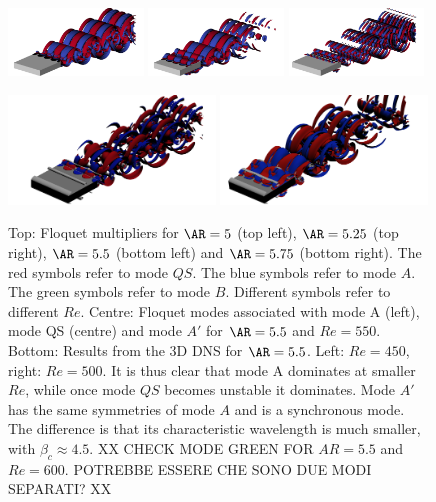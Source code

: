 \documentclass{jfm}
\begin{document}
\begin{figure}
\begin{tikzpicture}
  \end{tikzpicture}
  \vspace{0.1cm}
  \includegraphics[width=0.32\textwidth]{./fig/AR5s/Floqetmode_beta_2_Re550_AR5p5_A.png}
  \includegraphics[width=0.32\textwidth]{./fig/AR5s/Floqetmode_beta_2_Re550_AR5p5_QS.png} 
  \includegraphics[width=0.32\textwidth]{./fig/AR5s/Floqetmode_beta_4p75_Re550_AR5p5_Ap.png}
  \vspace{0.1cm}
  \vspace{0.1cm}
  \includegraphics[width=0.49\textwidth]{./fig/AR5s/lambda2-AR55-Re450-3D.png}   
  \includegraphics[width=0.49\textwidth]{./fig/AR5s/lambda2-AR55-Re500-3D.png}     
  \caption{Top: Floquet multipliers for $\AR=5$ (top left), $\AR=5.25$ (top right), $\AR=5.5$ (bottom left) and $\AR=5.75$ (bottom right). The red symbols refer to mode $QS$. The blue symbols refer to mode $A$. The green symbols refer to mode $B$. Different symbols refer to different $Re$. Centre: Floquet modes associated with mode A (left), mode QS (centre) and mode $A'$ for $\AR=5.5$ and $Re=550$. Bottom: Results from the 3D DNS for $\AR=5.5$. Left: $Re=450$, right: $Re=500$. It is thus clear that mode A dominates at smaller $Re$, while once mode $QS$ becomes unstable it dominates. Mode $A'$ has the same symmetries of mode $A$ and is a synchronous mode. The difference is that its characteristic wavelength is much smaller, with $\beta_c \approx 4.5$. XX CHECK MODE GREEN FOR $AR=5.5$ and $Re=600$. POTREBBE ESSERE CHE SONO DUE MODI SEPARATI? XX}
  \label{fig:mult_AR5s}
\end{figure} 
\end{document}
